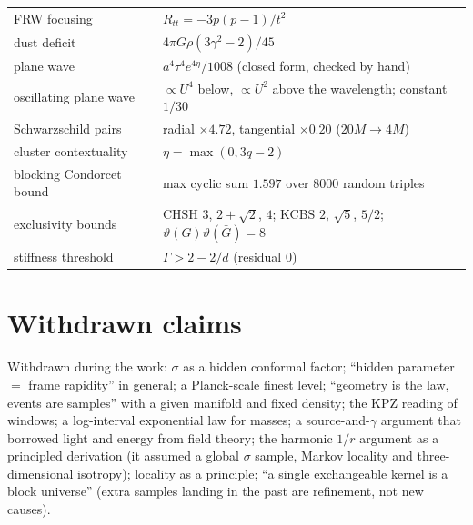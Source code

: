 \documentclass[11pt]{article}
\theoremstyle{definition}
\theoremstyle{remark}
\begin{document}
\begin{center}
\begin{tabular}{p{}p{}}
FRW focusing & $R_{tt}=-3p(p-1)/t^2$\\
dust deficit & $4\pi G\rho(3\gamma^2-2)/45$\\
plane wave & $a^4\tau^4e^{4\eta}/1008$ (closed form, checked by hand)\\
oscillating plane wave & $\propto U^4$ below, $\propto U^2$ above the wavelength; constant $1/30$\\
Schwarzschild pairs & radial $\times4.72$, tangential $\times0.20$ ($20M\to4M$)\\
cluster contextuality & $\eta=\max(0,3q-2)$\\
blocking Condorcet bound & max cyclic sum $1.597$ over $8000$ random triples\\
exclusivity bounds & CHSH $3$, $2+\sqrt2$, $4$; KCBS $2$, $\sqrt5$, $5/2$; $\vartheta(G)\vartheta(\bar G)=8$\\
stiffness threshold & $\Gamma>2-2/d$ (residual $0$)\\\bottomrule
\end{tabular}
\end{center}

\section{Withdrawn claims}\label{app:withdrawn}
Withdrawn during the work: $\sigma$ as a hidden conformal factor; ``hidden parameter $=$ frame rapidity'' in general; a Planck-scale finest level; ``geometry is the law, events are samples'' with a given manifold and fixed density; the KPZ reading of windows; a log-interval exponential law for masses; a source-and-$\gamma$ argument that borrowed light and energy from field theory; the harmonic $1/r$ argument as a principled derivation (it assumed a global $\sigma$ sample, Markov locality and three-dimensional isotropy); locality as a principle; ``a single exchangeable kernel is a block universe'' (extra samples landing in the past are refinement, not new causes).
\end{document}
